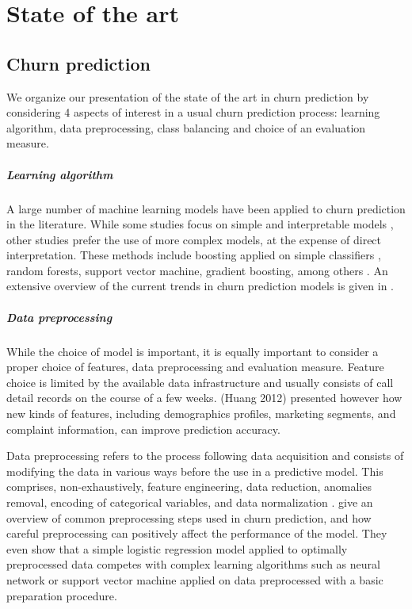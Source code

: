 \chapter{State of the art}
\label{ch:sota}

\section{Churn prediction}

We organize our presentation of the state of the art in churn prediction by
considering 4 aspects of interest in a usual churn prediction process: learning
algorithm, data preprocessing, class balancing and choice of an evaluation
measure.

\paragraph{Learning algorithm} A large number of machine learning models have
been applied to churn prediction in the literature. While some studies focus on
simple and interpretable models \parencite{keramati2014improved,
dahiya2015customer}, other studies prefer the use of more complex models, at the
expense of direct interpretation. These methods include boosting applied on
simple classifiers \parencite{vafeiadis2015comparison}, random forests, support
vector machine, gradient boosting, among others
\parencite{umayaparvathi2016attribute, verbeke2012new}. An extensive overview of
the current trends in churn prediction models is given in
\parencite{kayaalp2017review}.

\paragraph{Data preprocessing} While the choice of model is important, it is
equally important to consider a proper choice of features, data preprocessing
and evaluation measure. Feature choice is limited by the available data
infrastructure and usually consists of call detail records on the course of a
few weeks. (Huang 2012) presented however how new kinds of features, including
demographics profiles, marketing segments, and complaint information, can improve
prediction accuracy.

Data preprocessing refers to the process following data acquisition and
consists of modifying the data in various ways before the use in a predictive
model. This comprises, non-exhaustively, feature engineering, data reduction,
anomalies removal, encoding of categorical variables, and data normalization
\parencite{zhang2003data}. \textcite{coussement2017comparative} give an overview
of common preprocessing steps used in churn prediction, and how careful
preprocessing can positively affect the performance of the model. They even show
that a simple logistic regression model applied to optimally preprocessed data
competes with complex learning algorithms such as neural network or support
vector machine applied on data preprocessed with a basic preparation procedure.

